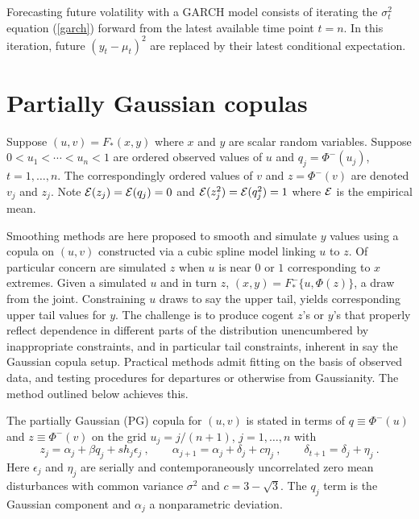 \documentclass[authoryear]{elsarticle}
\newcommand{\eps}{\epsilon}
\newcommand{\Ex}{{\cal E}}
\newcommand{\eref}[1]{(\ref{#1})}
\newcommand{\cq}{\ , \qquad}
\newcommand{\be}[1]{\begin{equation}\label{#1}}
\newcommand{\ee}{\end{equation}}
\begin{document}
Forecasting future volatility with  a GARCH model consists of iterating the $\sigma_t^2$ equation \eref{garch} forward from the latest available time point $t=n$.    In this iteration, future $(y_t-\mu_t)^2$ are replaced by their latest conditional expectation. 



\section{Partially Gaussian copulas}

Suppose $(u,v)=F_*(x,y)$  where $x$ and $y$ are scalar random variables.    Suppose $0<u_1<\cdots<u_n<1$  are   ordered observed values of $u$ and $q_j=\Phi^-(u_j)$, $t=1,\ldots,n$.  The correspondingly ordered values of $v$ and $z=\Phi^-(v)$ are denoted $v_j$ and $z_j$.  Note $\Ex(z_j)=\Ex(q_j)=0$ and $\Ex(z^2_j)=\Ex(q^2_j)=1$ where $\Ex$  is the empirical mean. 

Smoothing methods are here proposed to smooth and simulate $y$ values  using a copula on $(u,v)$ constructed via    a cubic spline model linking $u$ to $z$.   Of particular concern are simulated $z$ when $u$ is  near $0$ or $1$ corresponding to  $x$ extremes.    Given a simulated $u$ and in turn $z$, $(x,y)=F^-_*\{u,\Phi(z)\}$, a draw from the joint.  Constraining $u$ draws to say the upper tail, yields corresponding upper tail values for $y$.   The challenge is to produce cogent $z$'s or $y$'s that properly reflect dependence in different parts of the distribution unencumbered by inappropriate constraints, and in particular tail constraints, inherent in say the Gaussian copula setup.    Practical methods admit fitting on the basis of observed data, and testing procedures for  departures or otherwise from Gaussianity.   The method outlined below achieves this.

The partially Gaussian  (PG) copula for $(u,v)$ is stated in terms of  $q\equiv\Phi^-(u)$ and $z\equiv\Phi^-(v)$ on the grid   $u_j=j/(n+1)$, $j=1,\ldots,n$ with 
\be{cusp}
z_j = \alpha_j+\beta q_j+ sh_j\eps_j\cq \alpha_{j+1}=\alpha_j +\delta_j+c\eta_j\cq \delta_{t+1}=\delta_j+\eta_j\ .
\ee
Here $\eps_j$ and $\eta_j$ are serially and contemporaneously uncorrelated zero mean disturbances with common variance $\sigma^2$ and $c=3-\sqrt 3$. The  $q_j$ term is the   Gaussian component and  $\alpha_j$ a nonparametric deviation.   
\end{document}
